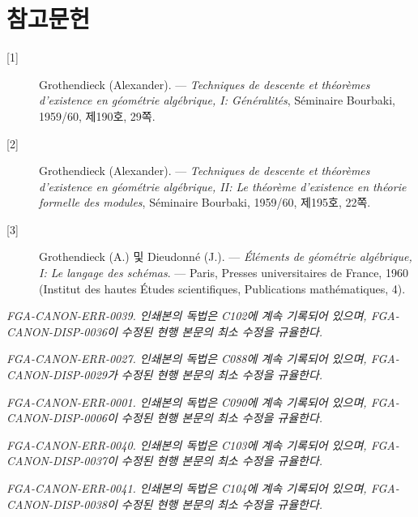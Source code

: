 \section*{참고문헌}

\begin{description}
\item[{[1]}] Grothendieck (Alexander). --- \emph{Techniques de descente et
théorèmes d'existence en géométrie algébrique, I: Généralités}, Séminaire
Bourbaki, 1959/60, 제190호, 29쪽.

\item[{[2]}] Grothendieck (Alexander). --- \emph{Techniques de descente et
théorèmes d'existence en géométrie algébrique, II: Le théorème d'existence en
théorie formelle des modules}, Séminaire Bourbaki, 1959/60, 제195호, 22쪽.

\item[{[3]}] Grothendieck (A.) 및 Dieudonné (J.). --- \emph{Éléments de
géométrie algébrique, I: Le langage des schémas}. --- Paris, Presses
universitaires de France, 1960 (Institut des hautes Études scientifiques,
Publications mathématiques, 4).
\end{description}

\par\smallskip
\begingroup\footnotesize
\noindent\textit{FGA-CANON-ERR-0039. 인쇄본의 독법은 C102에 계속 기록되어 있으며, FGA-CANON-DISP-0036이 수정된 현행 본문의 최소 수정을 규율한다.}\par
\noindent\textit{FGA-CANON-ERR-0027. 인쇄본의 독법은 C088에 계속 기록되어 있으며, FGA-CANON-DISP-0029가 수정된 현행 본문의 최소 수정을 규율한다.}\par
\noindent\textit{FGA-CANON-ERR-0001. 인쇄본의 독법은 C090에 계속 기록되어 있으며, FGA-CANON-DISP-0006이 수정된 현행 본문의 최소 수정을 규율한다.}\par
\noindent\textit{FGA-CANON-ERR-0040. 인쇄본의 독법은 C103에 계속 기록되어 있으며, FGA-CANON-DISP-0037이 수정된 현행 본문의 최소 수정을 규율한다.}\par
\noindent\textit{FGA-CANON-ERR-0041. 인쇄본의 독법은 C104에 계속 기록되어 있으며, FGA-CANON-DISP-0038이 수정된 현행 본문의 최소 수정을 규율한다.}\par
\endgroup
